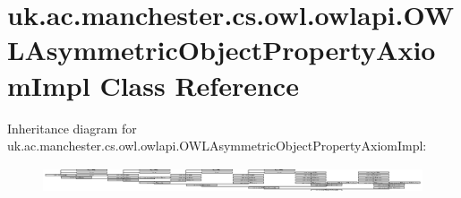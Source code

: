 \hypertarget{classuk_1_1ac_1_1manchester_1_1cs_1_1owl_1_1owlapi_1_1_o_w_l_asymmetric_object_property_axiom_impl}{\section{uk.\-ac.\-manchester.\-cs.\-owl.\-owlapi.\-O\-W\-L\-Asymmetric\-Object\-Property\-Axiom\-Impl Class Reference}
\label{classuk_1_1ac_1_1manchester_1_1cs_1_1owl_1_1owlapi_1_1_o_w_l_asymmetric_object_property_axiom_impl}
}
Inheritance diagram for uk.\-ac.\-manchester.\-cs.\-owl.\-owlapi.\-O\-W\-L\-Asymmetric\-Object\-Property\-Axiom\-Impl\-:\begin{figure}[H]
\begin{center}
\leavevmode
\includegraphics[height=0.765027cm]{classuk_1_1ac_1_1manchester_1_1cs_1_1owl_1_1owlapi_1_1_o_w_l_asymmetric_object_property_axiom_impl}
\end{center}
\end{figure}

